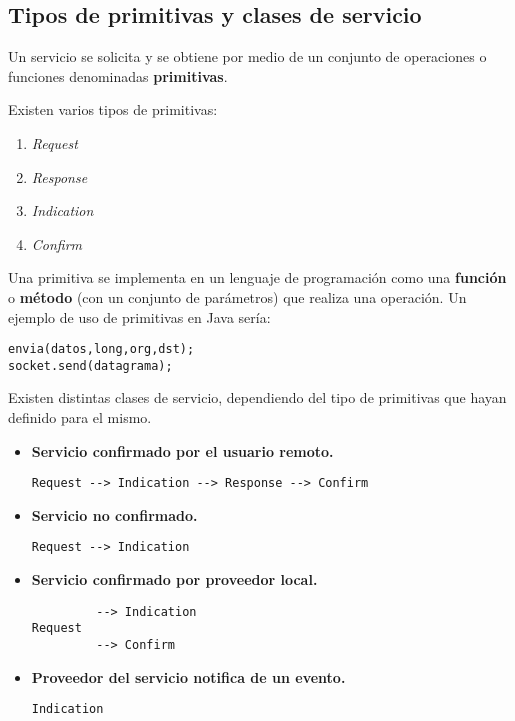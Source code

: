 \documentclass[a4paper]{book}
\numberwithin{figure}{chapter}
\numberwithin{equation}{subsection}
\begin{document}
\subsection{Tipos de primitivas y clases de servicio}
Un servicio se solicita y se obtiene por medio de un conjunto de operaciones o funciones denominadas \textbf{primitivas}.

Existen varios tipos de primitivas:
\begin{multicols}{2}
  \begin{enumerate}
    \item \textsl{Request}
    \item \textsl{Response}
    \item \textsl{Indication}
    \item \textsl{Confirm}
  \end{enumerate}

\end{multicols}
Una primitiva se implementa en un lenguaje de programación como una \textbf{función} o \textbf{método} (con un conjunto de parámetros) que realiza una operación. Un ejemplo de uso de primitivas en Java sería:

\begin{lstlisting}
envia(datos,long,org,dst);
socket.send(datagrama);
\end{lstlisting}

Existen distintas clases de servicio, dependiendo del tipo de primitivas que hayan definido para el mismo.
\begin{itemize}
  \item \textbf{Servicio confirmado por el usuario remoto.} \begin{verbatim}
Request --> Indication --> Response --> Confirm
\end{verbatim}
  \item \textbf{Servicio no confirmado.}
        \begin{verbatim}
Request --> Indication
\end{verbatim}
  \item \textbf{Servicio confirmado por proveedor local.}
        \begin{verbatim}
         --> Indication
Request
         --> Confirm
\end{verbatim}
  \item \textbf{Proveedor del servicio notifica de un evento.}
        \begin{verbatim}
Indication
\end{verbatim}
\end{itemize}
\end{document}
